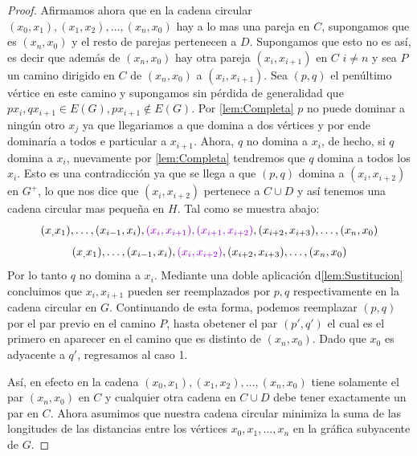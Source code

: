 \begin{proof}
Afirmamos ahora que en la cadena circular $(x_0,x_1),(x_1,x_2),\dots ,
(x_n,x_0)$ hay a lo mas una pareja en $C$, supongamos que es $(x_n,x_0)$ y el
resto de parejas pertenecen a $D$. Supongamos que esto no es así, es decir que
adem\'as de $(x_n,x_0)$ hay otra pareja $(x_i,x_{i+1})$ en $C$ $i\neq n$ y sea
$P$ un camino dirigido en $C$ de $(x_n,x_0)$ a $(x_i,x_{i+1})$. Sea $(p,q)$ el
penúltimo v\'ertice en este camino y supongamos sin p\'erdida de generalidad que
$px_i,qx_{i+1}\in E(G), px_{i+1}\notin E(G)$. Por \cref{lem:Completa} $p$ no
puede dominar a ningún otro $x_j$ ya que llegariamos a que domina a dos
v\'ertices y por ende dominaría a todos e particular a $x_{i+1}$. Ahora, $q$ no
domina a $x_i$, de hecho, si $q$ domina a $x_i$, nuevamente por
\cref{lem:Completa} tendremos que $q$ domina a todos los $x_i$.  Esto es una
contradicci\'on ya que se llega a que $(p,q)$ domina a $(x_i,x_{i+2})$ en
$G^+$, lo que nos dice que $(x_i,x_{i+2})$ pertenece a $C\cup D$ y así
tenemos una cadena circular mas pequeña en $H$. Tal como se muestra abajo:
$$ (x_,x_1), \dots , (x_{i-1},x_i ), {\color{malva} (x_i,x_{i+1}),
(x_{i+1},x_{i+2})},(x_{i+2},x_{i+3}), \dots , (x_n,x_0) $$
$$ (x_,x_1), \dots , (x_{i-1},x_i ), {\color{malva}
(x_i,x_{i+2})},(x_{i+2},x_{i+3}), \dots , (x_n,x_0) $$ Por lo tanto $q$ no
domina a $x_i$. Mediante una doble aplicaci\'on d\cref{lem:Sustitucion}
concluimos que $x_i,x_{i+1}$ pueden ser reemplazados por $p,q$ respectivamente
en la cadena circular en $G$. Continuando de esta forma, podemos reemplazar
$(p,q)$ por el par previo en el camino $P$, hasta obetener el par $(p',q')$ el
cual es el primero en aparecer en el camino que es distinto de $(x_n,x_0)$. Dado
que $x_0$ es adyacente a $q'$, regresamos al caso 1.

Así, en efecto en la cadena $(x_0,x_1),(x_1,x_2),\dots,(x_n,x_0)$ tiene solamente
el par $(x_n,x_0)$ en $C$ y cualquier otra cadena en $C\cup D$ debe tener
exactamente un par en $C$. Ahora asumimos que nuestra cadena circular minimiza
la suma de las longitudes de las distancias entre los vértices $x_0,x_1,\dots ,
x_n$ en la gráfica subyacente de $G$.


\end{proof}
